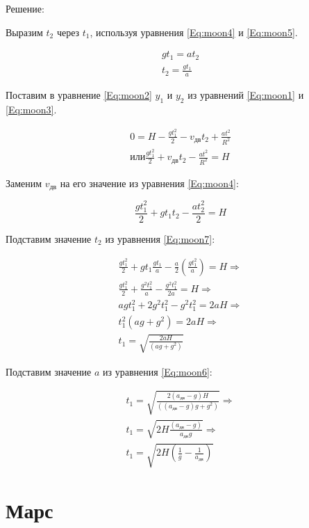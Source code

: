 \documentclass[12pt,a4paper]{article}
\begin{document}
Решение:

Выразим $t_2$ через $t_1$, используя уравнения \ref{Eq:moon4} и \ref{Eq:moon5}.

\begin{eqnarray}
  g t_1 = a t_2 \nonumber \\
  t_2 = \frac{g t_1}{a} \label{Eq:moon7}
\end{eqnarray}

Поставим в уравнение \ref{Eq:moon2} $y_1$ и $y_2$ из уравнений \ref{Eq:moon1} и
\ref{Eq:moon3}.

$$
\begin{array}{c}
  0 = H - \frac{g t^2_1}{2} - v_{\text{дв}}t_2 + \frac{a t^2}{R^2}\\
  \text{или} \frac{g t^2_1}{2} + v_{\text{дв}}t_2 - \frac{a t^2}{R^2} = H
\end{array}
$$

Заменим $v_{\text{дв}}$ на его значение из уравнения \ref{Eq:moon4}:

$$
\frac{g t_1^2}{2} + g t_1 t_2 - \frac{a t_2^2}{2} = H
$$

Подставим значение  $t_2$ из уравнения \ref{Eq:moon7}:

$$
\begin{array}{c}
  \frac{g t_1^2}{2} + g t_1 \frac{g t_1}{a} - \frac{a}{2} \left(\frac{g t_1^2}{a}\right) =
  H \Rightarrow \\
  \frac{g t_1^2}{2} + \frac{g^2 t_1^2}{a} - \frac{g^2 t_1^2}{2 a} = H \Rightarrow \\
  a g t_1^2 + 2 g^2 t_1^2 - g^2 t_1^2 = 2 a H \Rightarrow \\
  t_1^2 \left(ag + g^2\right) = 2aH \Rightarrow \\
  t_1 = \sqrt{\frac{2 a H}{\left(a g + g^2\right)}}
\end{array}
$$

Подставим значение $a$ из уравнения \ref{Eq:moon6}:

$$
\begin{array}{c}
  t_1 = \sqrt{\frac{2 \left(a_{\text{дв}} - g\right) H}{\left((a_{\text{дв}} - g) g + g^2\right)}} \Rightarrow \\
  t_1 = \sqrt{2 H \frac{\left(a_{\text{дв}} - g\right)}{a_{\text{дв}} g}} \Rightarrow \\
    t_1 = \sqrt{2 H \left(\frac{1}{g} - \frac{1}{a_{\text{дв}}}\right)}  
\end{array}
$$

\section{Марс}
\end{document}

